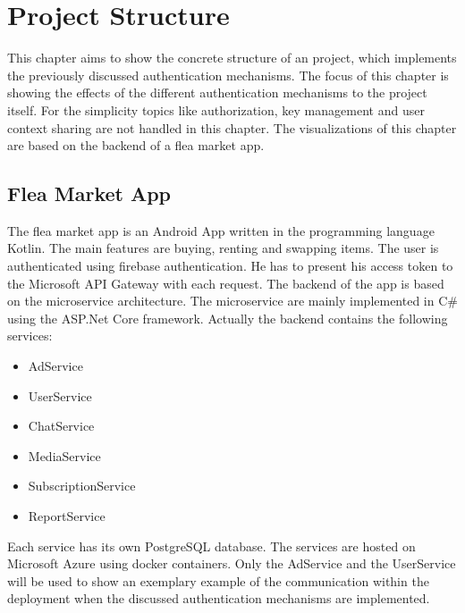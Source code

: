 \chapter{Project Structure}
\label{cha:project_structure}
This chapter aims to show the concrete structure of an project, which implements the previously discussed authentication mechanisms.
The focus of this chapter is showing the effects of the different authentication mechanisms to the project itself.
For the simplicity topics like authorization, key management and user context sharing are not handled in this chapter.
The visualizations of this chapter are based on the backend of a flea market app.

\section{Flea Market App}
The flea market app is an Android App written in the programming language Kotlin.
The main features are buying, renting and swapping items.
The user is authenticated using firebase authentication.
He has to present his access token to the Microsoft API Gateway with each request.
The backend of the app is based on the microservice architecture.
The microservice are mainly implemented in C\# using the ASP.Net Core framework.
Actually the backend contains the following services:
\begin{itemize}
	\item AdService
	\item UserService
	\item ChatService
	\item MediaService
	\item SubscriptionService
	\item ReportService
\end{itemize}
Each service has its own PostgreSQL database.
The services are hosted on Microsoft Azure using docker containers.
Only the AdService and the UserService will be used to show an exemplary example of the communication within the deployment when the discussed authentication mechanisms are implemented.

